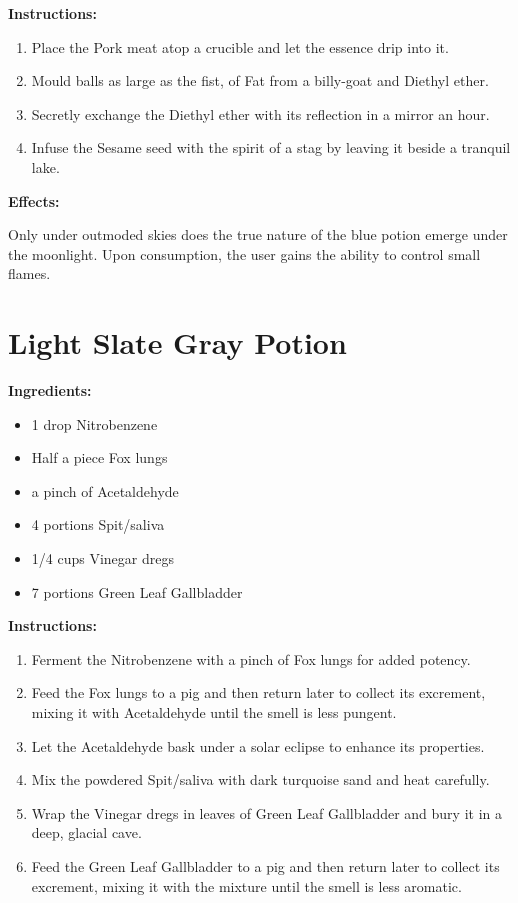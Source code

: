 \documentclass{article}
\begin{document}
\textbf{Instructions:}

\begin{enumerate}
  \item Place the Pork meat atop a crucible and let the essence drip into it.
  \item Mould balls as large as the fist, of Fat from a billy-goat and Diethyl ether.
  \item Secretly exchange the Diethyl ether with its reflection in a mirror an hour.
  \item Infuse the Sesame seed with the spirit of a stag by leaving it beside a tranquil lake.
\end{enumerate}

\textbf{Effects:}

Only under outmoded skies does the true nature of the blue potion emerge under the moonlight. Upon consumption, the user gains the ability to control small flames.

\newpage
\section*{Light Slate Gray Potion}

\textbf{Ingredients:}

\begin{itemize}
  \item 1 drop Nitrobenzene
  \item Half a piece Fox lungs
  \item a pinch of Acetaldehyde
  \item 4 portions Spit/saliva
  \item 1/4 cups Vinegar dregs
  \item 7 portions Green Leaf Gallbladder
\end{itemize}

\textbf{Instructions:}

\begin{enumerate}
  \item Ferment the Nitrobenzene with a pinch of Fox lungs for added potency.
  \item Feed the Fox lungs to a pig and then return later to collect its excrement, mixing it with Acetaldehyde until the smell is less pungent.
  \item Let the Acetaldehyde bask under a solar eclipse to enhance its properties.
  \item Mix the powdered Spit/saliva with dark turquoise sand and heat carefully.
  \item Wrap the Vinegar dregs in leaves of Green Leaf Gallbladder and bury it in a deep, glacial cave.
  \item Feed the Green Leaf Gallbladder to a pig and then return later to collect its excrement, mixing it with the mixture until the smell is less aromatic.
\end{enumerate}
\end{document}
